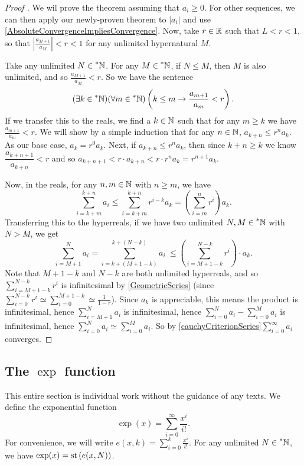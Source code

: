 \begin{proof}[Proof ]
    We wil prove the theorem assuming that $a_i \geq 0$. For other sequences, we can then apply our newly-proven theorem to $|a_i|$ and use \autoref{AbsoluteConvergenceImpliesConvergence}. Now, take $r \in \mathbb{R}$ such that $L < r < 1$, so that $\left|\frac{a_{M+1}}{a_M}\right| < r < 1$ for any unlimited hypernatural $M$.

    Take any unlimited $N \in \prescript{*}{}{\mathbb{N}}$. For any $M \in \prescript{*}{}{\mathbb{N}}$, if $N \leq M$, then $M$ is also unlimited, and so $\frac{a_{M+1}}{a_M} < r$. So we have the sentence
    \[ 
    (\exists k \in \prescript{*}{}{\mathbb{N}})(\forall m \in \prescript{*}{}{\mathbb{N}})\left(k \leq m \to \frac{a_{m+1}}{a_m} < r\right). 
    \]
    If we transfer this to the reals, we find a $k \in \mathbb{N}$ such that for any $m \geq k$ we have $\frac{a_{m+1}}{a_m} < r$. We will show by a simple induction that for any $n \in \mathbb{N}$, $a_{k+n} \leq r^n a_k$. As our base case, $a_k = r^0 a_k$. Next, if $a_{k+n} \leq r^n a_k$, then since $k+n \geq k$ we know $\dfrac{a_{k+n+1}}{a_{k+n}} < r$ and so $a_{k+n+1} < r \cdot a_{k+n} < r \cdot r^n a_k = r^{n+1}a_k$.

    Now, in the reals, for any $n, m \in \mathbb{N}$ with $n \geq m$, we have 
    \[ 
    \sum_{i=k+m}^{k+n} a_i \leq \sum_{i=k+m}^{k+n} r^{i-k} a_k = \left(\sum_{i=m}^n r^i\right) a_k. 
    \]
    Transferring this to the hyperreals, if we have two unlimited $N, M \in \prescript{*}{}{\mathbb{N}}$ with $N > M$, we get
    \[ 
    \sum_{i=M+1}^N a_i = \sum_{i=k+(M+1-k)}^{k+(N-k)} a_i \ \leq \left(\sum_{i=M+1-k}^{N-k} r^i \right) \cdot a_k. 
    \]
    Note that $M+1-k$ and $N-k$ are both unlimited hyperreals, and so $\sum_{i=M+1-k}^{N-k} r^i$ is infinitesimal by \autoref{GeometricSeries} (since $\sum_{i=0}^{N-k} r^i \simeq \sum_{i=0}^{M+1-k} \simeq \frac{1}{1-r}$). Since $a_k$ is appreciable, this means the product is infinitesimal, hence $\sum_{i=M+1}^N a_i$ is infinitesimal, hence $\sum_{i=0}^N a_i - \sum_{i=0}^M a_i$ is infinitesimal, hence $\sum_{i=0}^N a_i \simeq \sum_{i=0}^M a_i$. So by \autoref{cauchyCriterionSeries}$\sum_{i=0}^\infty a_i$ converges.
\end{proof}

\subsection{The \texorpdfstring{$\exp$}{exp} function}\label{sec:expSec}
This entire section is individual work without the guidance of any texts. We define the exponential function \[\exp(x) = \sum_{i=0}^\infty \frac{x^i}{i!}.
\]
For convenience, we will write $e(x, k) = \sum_{i=0}^k \frac{x^i}{i!}$. For any unlimited $N \in \prescript{*}{}{\mathbb{N}}$, we have $\exp(x) = \operatorname{st}\left(e(x, N)\right)$.

